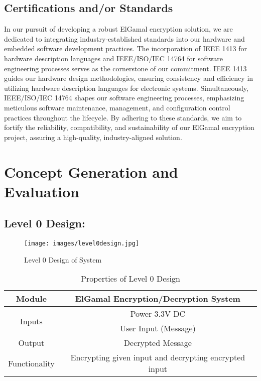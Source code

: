 \documentclass[12pt]{article}
\begin{document}
	\subsection{Certifications and/or Standards}
	In our pursuit of developing a robust ElGamal encryption solution, we are dedicated to integrating industry-established standards into our hardware and embedded software development practices. The incorporation of IEEE 1413 for hardware description languages and IEEE/ISO/IEC 14764 for software engineering processes serves as the cornerstone of our commitment. IEEE 1413 guides our hardware design methodologies, ensuring consistency and efficiency in utilizing hardware description languages for electronic systems. Simultaneously, IEEE/ISO/IEC 14764 shapes our software engineering processes, emphasizing meticulous software maintenance, management, and configuration control practices throughout the lifecycle. By adhering to these standards, we aim to fortify the reliability, compatibility, and sustainability of our ElGamal encryption project, assuring a high-quality, industry-aligned solution.
	\section{Concept Generation and Evaluation}
	
	\subsection{Level 0 Design:}
	\begin{figure}[h]
		\centering
		\label{Level 0 Design of System }
		\texttt{[image: images/level0design.jpg]}\\[0.5 cm]	
		\caption{Level 0 Design of System } 		
	\end{figure}
	\begin{table}[h]
		\centering
		
		\label{Properties Of Level 0 Design }
		\begin{tabular}{|c|c|}
			\hline
			Module & ElGamal Encryption/Decryption System \\ \hline
			\multirow{2}{*}{Inputs} & Power 3.3V DC \\ \cline{2-2}
			& User Input (Message) \\ \hline
			Output & Decrypted Message \\ \hline
			Functionality & Encrypting given input and  decrypting encrypted input \\ \hline
		
		\end{tabular}
		\caption{Properties of Level 0 Design }
	\end{table}
	
\end{document}
